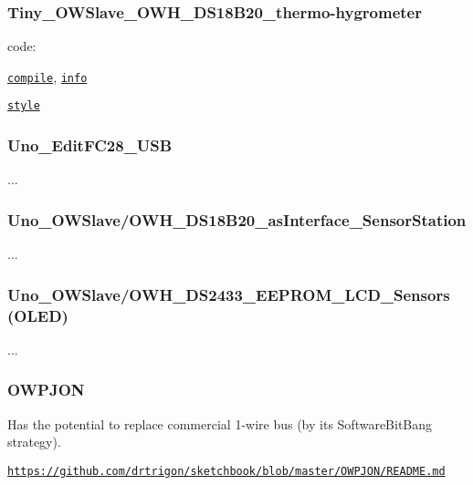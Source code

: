 \subsubsection*{Tiny\-\_\-\-O\-W\-Slave\-\_\-\-O\-W\-H\-\_\-\-D\-S18\-B20\-\_\-thermo-\/hygrometer}

code\-:
\begin{DoxyItemize}
\item \href{https://github.com/drtrigon/sketchbook/blob/result/docu/Tiny_OWSlave_OWH_DS18B20_thermo-hygrometer/Tiny_OWSlave_OWH_DS18B20_thermo-hygrometer.ino.compile}{\tt compile}, \href{https://github.com/drtrigon/sketchbook/blob/result/docu/Tiny_OWSlave_OWH_DS18B20_thermo-hygrometer/Tiny_OWSlave_OWH_DS18B20_thermo-hygrometer.ino.info}{\tt info}
\item \href{https://github.com/drtrigon/sketchbook/blob/result/docu/Tiny_OWSlave_OWH_DS18B20_thermo-hygrometer/Tiny_OWSlave_OWH_DS18B20_thermo-hygrometer.ino.style}{\tt style}
\end{DoxyItemize}

\subsubsection*{Uno\-\_\-\-Edit\-F\-C28\-\_\-\-U\-S\-B}

...

\subsubsection*{Uno\-\_\-\-O\-W\-Slave/\-O\-W\-H\-\_\-\-D\-S18\-B20\-\_\-as\-Interface\-\_\-\-Sensor\-Station}

...

\subsubsection*{Uno\-\_\-\-O\-W\-Slave/\-O\-W\-H\-\_\-\-D\-S2433\-\_\-\-E\-E\-P\-R\-O\-M\-\_\-\-L\-C\-D\-\_\-\-Sensors (O\-L\-E\-D)}

...

\subsubsection*{O\-W\-P\-J\-O\-N}

Has the potential to replace commercial 1-\/wire bus (by its Software\-Bit\-Bang strategy).

\href{https://github.com/drtrigon/sketchbook/blob/master/OWPJON/README.md}{\tt https\-://github.\-com/drtrigon/sketchbook/blob/master/\-O\-W\-P\-J\-O\-N/\-R\-E\-A\-D\-M\-E.\-md}

